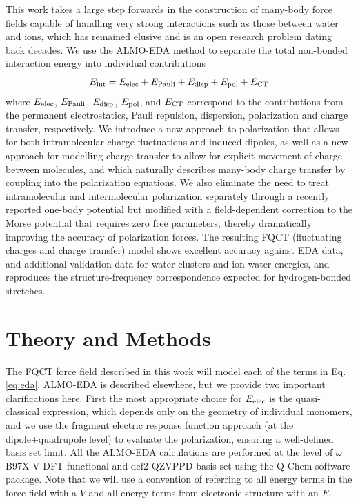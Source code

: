 \documentclass[journal=jctcce,manuscript=article]{achemso}
\begin{document}
This work takes a large step forwards in the construction of many-body force fields capable of handling very strong interactions such as those
between water and ions, which has remained elusive and is an open research problem dating back decades. We use the ALMO-EDA method\cite{Khaliullin2007,Horn2016} to separate the total non-bonded interaction energy into individual contributions
\begin{equation}
E_{\rm int} = E_{\rm elec} + E_{\rm Pauli} + E_{\rm disp} + E_{\rm pol} +  E_{\rm CT}
 \label{eq:eda}
\end{equation}
where $E_{\rm elec}$, $E_{\rm Pauli}$, $ E_{\rm disp}$, $E_{\rm pol}$, and  $E_{\rm CT}$ correspond to the contributions from the permanent electrostatics, Pauli repulsion, dispersion, polarization and charge transfer, respectively. We introduce a new approach to polarization that allows for both intramolecular charge fluctuations and induced dipoles, as well as a new approach for modelling charge transfer to allow for explicit movement of charge between molecules, and which naturally describes many-body charge transfer by coupling into the polarization equations. We also eliminate the need to treat intramolecular and intermolecular polarization separately through a recently reported one-body potential\cite{Sami2024} but modified with a field-dependent correction to the Morse potential that requires zero free parameters, thereby dramatically improving the accuracy of polarization forces. The resulting FQCT (fluctuating charges and charge transfer) model shows excellent accuracy against EDA data, and additional validation data for water clusters and ion-water energies, and reproduces the structure-frequency correspondence expected for hydrogen-bonded  stretches.

\section*{Theory and Methods}
The FQCT force field described in this work will model each of the terms in Eq. \ref{eq:eda}. ALMO-EDA is described elsewhere\cite{Khaliullin2007,Horn2016}, but we provide two important clarifications here. First the most appropriate choice for $E_{\rm elec}$ is the quasi-classical expression, which depends only on the geometry of individual monomers\cite{Mao2016}, and we use the fragment electric response function approach (at the dipole+quadrupole level) to evaluate the  polarization, ensuring a well-defined basis set limit.\cite{Horn2015} All the ALMO-EDA calculations are performed at the level of $\omega$B97X-V DFT functional\cite{Mardirossian2014} and def2-QZVPPD basis set\cite{Rappoport2010} using the Q-Chem software package\cite{Q-chem}. Note that we will use a convention of referring to all energy terms in the force field with a $V$ and all energy terms from electronic structure
with an $E$. 
\end{document}

